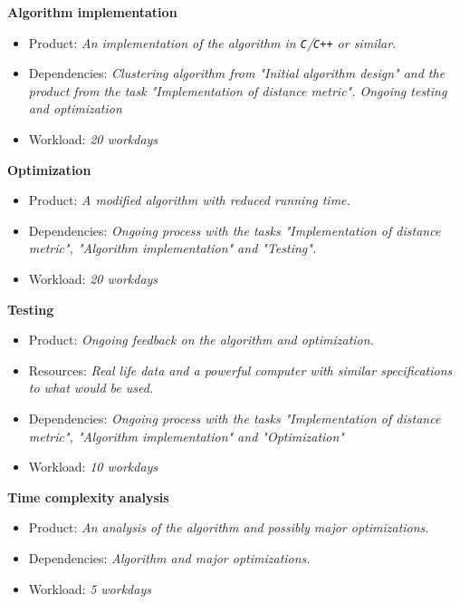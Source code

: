 \documentclass[11pt,a4paper]{article}
\begin{document}
\noindent
\textbf{Algorithm implementation}
\begin{itemize}
  \item Product: \textit{An implementation of the algorithm in
    \texttt{C}/\texttt{C++} or similar.}
  \item Dependencies: \textit{Clustering algorithm from "Initial algorithm
    design" and the product from the task "Implementation of distance metric".
    Ongoing testing and optimization}
  \item Workload: \textit{20 workdays}
\end{itemize}

\noindent
\textbf{Optimization}
\begin{itemize}
  \item Product: \textit{A modified algorithm with reduced running time.}
  \item Dependencies: \textit{Ongoing process with the tasks "Implementation of
    distance metric", "Algorithm implementation" and "Testing".}
  \item Workload: \textit{20 workdays}
\end{itemize}

\noindent
\textbf{Testing}
\begin{itemize}
  \item Product: \textit{Ongoing feedback on the algorithm and optimization.}
  \item Resources: \textit{Real life data and a powerful computer with similar
    specifications to what would be used.}
  \item Dependencies: \textit{Ongoing process with the tasks "Implementation of
    distance metric", "Algorithm implementation" and "Optimization"}
  \item Workload: \textit{10 workdays}
\end{itemize}

\noindent
\textbf{Time complexity analysis}
\begin{itemize}
  \item Product: \textit{An analysis of the algorithm and possibly major
    optimizations.}
  \item Dependencies: \textit{Algorithm and major optimizations.}
  \item Workload: \textit{5 workdays}
\end{itemize}
\end{document}
